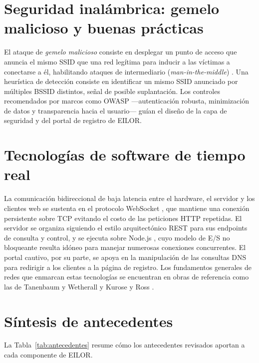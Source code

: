 \section{Seguridad inalámbrica: gemelo malicioso y buenas prácticas}
El ataque de \emph{gemelo malicioso} consiste en desplegar un punto de acceso que anuncia el mismo SSID que una red legítima para inducir a las víctimas a conectarse a él, habilitando ataques de intermediario (\emph{man\nobreakdash-in\nobreakdash-the\nobreakdash-middle}) \parencite{callegati2009}. Una heurística de detección consiste en identificar un mismo SSID anunciado por múltiples BSSID distintos, señal de posible suplantación. Los controles recomendados por marcos como OWASP \parencite{owasp2021} ---autenticación robusta, minimización de datos y transparencia hacia el usuario--- guían el diseño de la capa de seguridad y del portal de registro de EILOR.

\section{Tecnologías de software de tiempo real}
La comunicación bidireccional de baja latencia entre el hardware, el servidor y los clientes web se sustenta en el protocolo WebSocket \parencite{rfc6455}, que mantiene una conexión persistente sobre TCP evitando el costo de las peticiones HTTP repetidas. El servidor se organiza siguiendo el estilo arquitectónico REST \parencite{fielding2002} para sus endpoints de consulta y control, y se ejecuta sobre Node.js \parencite{nodejs2024}, cuyo modelo de E/S no bloqueante resulta idóneo para manejar numerosas conexiones concurrentes. El portal cautivo, por su parte, se apoya en la manipulación de las consultas DNS \parencite{rfc1035} para redirigir a los clientes a la página de registro. Los fundamentos generales de redes que enmarcan estas tecnologías se encuentran en obras de referencia como las de Tanenbaum y Wetherall \parencite{tanenbaum2011} y Kurose y Ross \parencite{kurose2017}.

\section{Síntesis de antecedentes}
La Tabla~\ref{tab:antecedentes} resume cómo los antecedentes revisados aportan a cada componente de EILOR.

